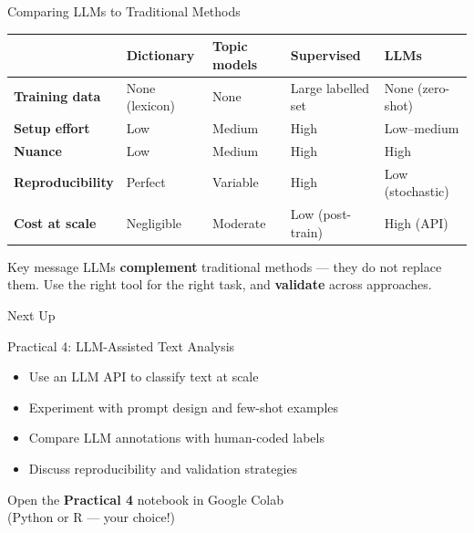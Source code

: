 \documentclass[aspectratio=169]{beamer}
\begin{document}
\begin{frame}{Comparing LLMs to Traditional Methods}
    \footnotesize
    \begin{center}
        \begin{tabular}{@{}l>{\raggedright\arraybackslash}p{2.2cm}>{\raggedright\arraybackslash}p{2cm}>{\raggedright\arraybackslash}p{2.3cm}>{\raggedright\arraybackslash}p{2.3cm}@{}}
            \toprule
            & \textbf{Dictionary} & \textbf{Topic models} & \textbf{Supervised} & \textbf{LLMs} \\
            \midrule
            \textbf{Training data}  & None (lexicon) & None            & Large labelled set & None (zero-shot) \\
            \textbf{Setup effort}   & Low            & Medium          & High               & Low--medium \\
            \textbf{Nuance}         & Low            & Medium          & High               & High \\
            \textbf{Reproducibility}& Perfect        & Variable        & High               & Low (stochastic) \\
            \textbf{Cost at scale}  & Negligible     & Moderate        & Low (post-train)   & High (API) \\
            \bottomrule
        \end{tabular}
    \end{center}

    \vspace{0.2cm}
    \begin{alertblock}{Key message}
        LLMs \textbf{complement} traditional methods --- they do not replace them. Use the right tool for the right task, and \textbf{validate} across approaches.
    \end{alertblock}
\end{frame}

\begin{frame}{Next Up}
    \begin{center}
        {\Large \alert{Practical 4: LLM-Assisted Text Analysis}}\\[0.5cm]
        \begin{itemize}
            \item Use an LLM API to classify text at scale
            \item Experiment with prompt design and few-shot examples
            \item Compare LLM annotations with human-coded labels
            \item Discuss reproducibility and validation strategies
        \end{itemize}
        \vspace{0.5cm}
        {\normalsize Open the \textbf{Practical 4} notebook in Google Colab\\(Python or R --- your choice!)}
    \end{center}
\end{frame}
\end{document}
